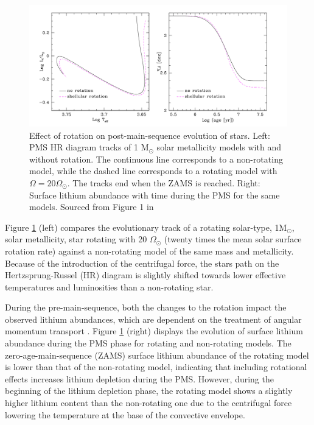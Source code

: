 \begin{figure}[h]
    \includegraphics[width=\textwidth]{Figures/intro_figures/PMS_effect.png}
    \caption[Effect of rotation on pre-main-sequence evolution of a 1 $M_{\odot}$ star.]{Effect of rotation on post-main-sequence evolution of stars. Left: PMS HR diagram tracks of 1 M$_{\odot}$ solar metallicity models with and without rotation. The continuous line corresponds to a non-rotating model, while the dashed line corresponds to a rotating model with $\Omega = 20 \Omega_{\odot}$. The tracks end when the ZAMS is reached. Right: Surface lithium abundance with time during the PMS for the same models. Sourced from Figure 1 in \citet{eggenberger_rotation_2013}}
    \label{fig:pms_effect}
\end{figure}

Figure \ref{fig:pms_effect} (left) compares the evolutionary track of a rotating solar-type, 1M$_{\odot}$, solar metallicity, star rotating with 20 $\Omega_{\odot}$ (twenty times the mean solar surface rotation rate) against a non-rotating model of the same mass and metallicity. 
Because of the introduction of the centrifugal force, the stars path on the Hertzsprung-Russel (HR) diagram is slightly shifted towards lower effective temperatures and luminosities than a non-rotating star.

During the pre-main-sequence, both the changes to the rotation impact the observed lithium abundances, which are dependent on the treatment of angular momentum transport \citep{dumont_lithium_2021}.
Figure \ref{fig:pms_effect} (right) displays the evolution of surface lithium abundance during the PMS phase for rotating and non-rotating models. 
The zero-age-main-sequence (ZAMS) surface lithium abundance of the rotating model is lower than that of the non-rotating model, indicating that including rotational effects increases lithium depletion during the PMS. 
However, during the beginning of the lithium depletion phase, the rotating model shows a slightly higher lithium content than the non-rotating one due to the centrifugal force lowering the temperature at the base of the convective envelope.

